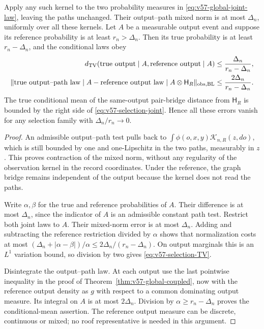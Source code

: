\begin{theorem}
\label{thm:v57-selection}
Apply any such kernel to the two probability measures in
\eqref{eq:v57-global-joint-law}, leaving the paths unchanged. Their
output--path mixed norm is at most $\Delta_n$, uniformly over all
these kernels. Let $A$ be a measurable output event and suppose its
reference probability is at least $r_n>\Delta_n$. Then its true
probability is at least $r_n-\Delta_n$, and the conditional laws obey
\begin{align}
 d_{\rm TV}(\text{true output}\mid A,
                       \text{reference output}\mid A)
        &\le\frac{\Delta_n}{r_n-\Delta_n},
                                      \label{eq:v57-selection-TV}\\
 \|\text{true output--path law}\mid A
       -\text{reference output law}\mid A\otimes\mathsf H_R
       \|_{\mathrm{obs},\mathrm{BL}}
        &\le\frac{2\Delta_n}{r_n-\Delta_n}.
                                      \label{eq:v57-selection-joint}
\end{align}
The true conditional mean of the same-output pair-bridge distance
from $\mathsf H_R$ is bounded by the right side of
\eqref{eq:v57-selection-joint}. Hence all these errors vanish for
any selection family with $\Delta_n/r_n\to0$.
\end{theorem}
\begin{proof}
An admissible output--path test pulls back to
$\int\phi(o,x,y)\mathscr K_{n,R}(z,do)$, which is still bounded by
one and one-Lipschitz in the two paths, measurably in $z$. This proves
contraction of the mixed norm, without any regularity of the
observation kernel in the record coordinates. Under the reference,
the graph bridge remains independent of the output because the kernel
does not read the paths.

Write $\alpha,\beta$ for the true and reference probabilities of $A$.
Their difference is at most $\Delta_n$, since the indicator of $A$
is an admissible constant path test. Restrict both joint laws to $A$.
Their mixed-norm error is at most $\Delta_n$. Adding and subtracting
the reference restriction divided by $\alpha$ shows that normalization
costs at most
$(\Delta_n+|\alpha-\beta|)/\alpha\le2\Delta_n/(r_n-\Delta_n)$.
On output marginals this is an $L^1$ variation bound, so division by
two gives \eqref{eq:v57-selection-TV}.

Disintegrate the output--path law. At each output use the last
pointwise inequality in the proof of
Theorem~\ref{thm:v57-global-coupled}, now with the reference output
density as $g$ with respect to a common dominating output measure.
Its integral on $A$ is at most $2\Delta_n$. Division by
$\alpha\ge r_n-\Delta_n$ proves the conditional-mean assertion.
The reference output measure can be discrete, continuous or mixed;
no roof representative is needed in this argument.
\end{proof}

